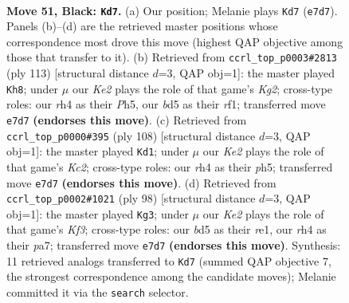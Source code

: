 \documentclass[11pt]{article}
\begin{document}
\clearpage

\begin{figure}[p]\centering
\begin{subfigure}{0.46\textwidth}\centering
\resizebox{\linewidth}{!}{%
\newchessgame
\chessboard[
  setfen={2r5/4k3/8/1P1B4/7R/4K3/8/8 b - - 0 51},
  showmover=false,
  pgfstyle=straightmove, color=movearrow, markmove={e7-d7}
]}
\caption{}
\end{subfigure}\hfill
\begin{subfigure}{0.46\textwidth}\centering
\resizebox{\linewidth}{!}{%
\newchessgame
\chessboard[
  setfen={8/6k1/1r6/7p/2P5/8/3K4/5R2 b - - 0 57},
  showmover=false,
  pgfstyle=straightmove, color=movearrow, markmove={g7-h8}
]}
\caption{}
\end{subfigure}
\\[4pt]
\begin{subfigure}{0.46\textwidth}\centering
\resizebox{\linewidth}{!}{%
\newchessgame
\chessboard[
  setfen={8/8/R7/4b1pp/8/5k2/2K5/8 w - - 2 55},
  showmover=false,
  pgfstyle=straightmove, color=movearrow, markmove={c2-d1}
]}
\caption{}
\end{subfigure}\hfill
\begin{subfigure}{0.46\textwidth}\centering
\resizebox{\linewidth}{!}{%
\newchessgame
\chessboard[
  setfen={2R5/p7/6k1/8/P7/5K2/8/4r3 w - - 9 50},
  showmover=false,
  pgfstyle=straightmove, color=movearrow, markmove={f3-g3}
]}
\caption{}
\end{subfigure}
\caption{\textbf{Move 51, Black: \texttt{Kd7}.} (a) Our position; Melanie plays \texttt{Kd7} (\texttt{e7d7}). Panels (b)--(d) are the retrieved master positions whose correspondence most drove this move (highest QAP objective among those that transfer to it). (b) Retrieved from \texttt{ccrl\_top\_p0003\#2813} (ply 113) [structural distance $d$=3, QAP obj=1]: the master played \texttt{Kh8}; under $\mu$ our \emph{Ke2} plays the role of that game's \emph{Kg2}; cross-type roles: our \emph{r}h4 as their \emph{P}h5, our \emph{b}d5 as their \emph{r}f1; transferred move \texttt{e7d7} \textbf{(endorses this move)}. (c) Retrieved from \texttt{ccrl\_top\_p0000\#395} (ply 108) [structural distance $d$=3, QAP obj=1]: the master played \texttt{Kd1}; under $\mu$ our \emph{Ke2} plays the role of that game's \emph{Kc2}; cross-type roles: our \emph{r}h4 as their \emph{p}h5; transferred move \texttt{e7d7} \textbf{(endorses this move)}. (d) Retrieved from \texttt{ccrl\_top\_p0002\#1021} (ply 98) [structural distance $d$=3, QAP obj=1]: the master played \texttt{Kg3}; under $\mu$ our \emph{Ke2} plays the role of that game's \emph{Kf3}; cross-type roles: our \emph{b}d5 as their \emph{r}e1, our \emph{r}h4 as their \emph{p}a7; transferred move \texttt{e7d7} \textbf{(endorses this move)}. Synthesis: 11 retrieved analogs transferred to \texttt{Kd7} (summed QAP objective 7, the strongest correspondence among the candidate moves); Melanie committed it via the \texttt{search} selector.}
\label{fig:thought-m101}
\end{figure}
\end{document}
